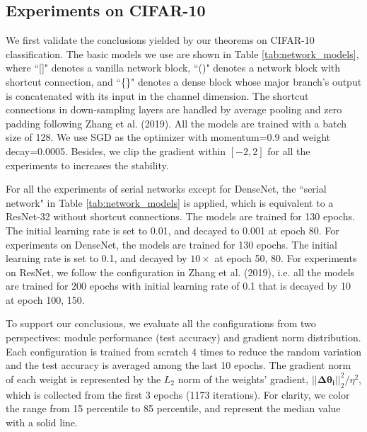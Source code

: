 \documentclass[10pt,journal,compsoc]{IEEEtran}
\begin{document}
\subsection{Experiments on CIFAR-10}\label{sec: cifar10_exp}
We first validate the conclusions yielded by our theorems on CIFAR-10 classification.
The basic models we use are shown in Table \ref{tab:network_models}, where ``[]" denotes a vanilla network block, ``()" denotes a network block with shortcut connection, and ``\{\}" denotes a dense block whose major branch's output is concatenated with its input in the channel dimension. The shortcut connections in down-sampling layers are handled by average pooling and zero padding following Zhang et al. (2019)\cite{zhang2019fixup}. All the models are trained with a batch size of 128. We use SGD as the optimizer with momentum=0.9 and weight decay=0.0005. Besides, we clip the gradient within $[-2, 2]$ for all the experiments to increases the stability. 

For all the experiments of serial networks except for DenseNet, the ``serial network" in Table \ref{tab:network_models} is applied, which is equivalent to a ResNet-32 without shortcut connections. The models are trained for 130 epochs. The initial learning rate is set to 0.01, and decayed to 0.001 at epoch 80. For experiments on DenseNet, the models are trained for 130 epochs. The initial learning rate is set to 0.1, and decayed by $10\times$ at epoch 50, 80. For experiments on ResNet, we follow the configuration in Zhang et al. (2019)\cite{zhang2019fixup}, i.e. all the models are trained for 200 epochs with initial learning rate of 0.1 that is decayed by 10 at epoch 100, 150. 

To support our conclusions,  we evaluate all the configurations from two perspectives: module performance (test accuracy) and gradient norm distribution. Each configuration is trained from scratch 4 times to reduce the random variation and the test accuracy is averaged among the last 10 epochs. The gradient norm of each weight is represented by the $L_2$ norm of the weights' gradient, $||\mathbf{\Delta \theta_i}||^2_2/\eta^2$, which is collected from the first 3 epochs (1173 iterations). For clarity, we color the range from 15 percentile to 85 percentile, and represent the median value with a solid line.
 
\end{document}
